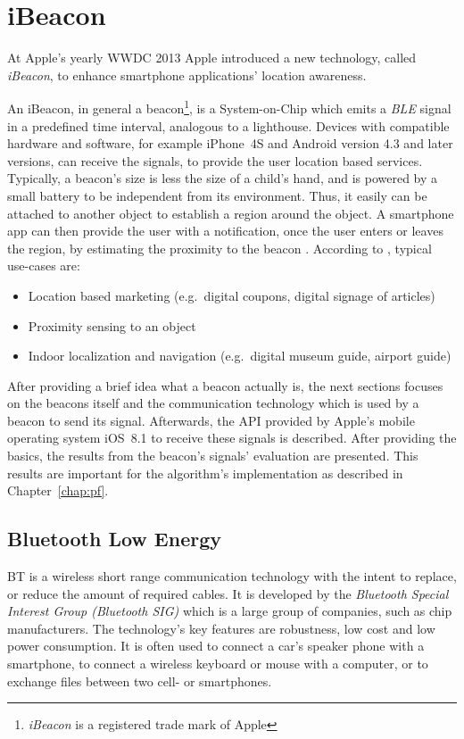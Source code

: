 \chapter{iBeacon} \label{chap:ibeacons}
At Apple's yearly \ac{WWDC} 2013 Apple introduced a new technology, called \emph{iBeacon}, to enhance smartphone applications' location awareness.

An iBeacon, in general a beacon\footnote{\emph{iBeacon} is a registered trade mark of Apple}, is a System-on-Chip which emits a \emph{\acl{BLE}} signal in a predefined time interval, analogous to a lighthouse. Devices with compatible hardware and software, for example iPhone~4S and Android version 4.3 and later versions, can receive the signals, to provide the user location based services. Typically, a beacon's size is less the size of a child's hand, and is powered by a small battery to be independent from its environment. Thus, it easily can be attached to another object to establish a region around the object. A smartphone app can then provide the user with a notification, once the user enters or leaves the region, by estimating the proximity to the beacon \citep{apple:getting_started,binside:ds}. According to \citet{binside:ds}, typical use-cases are:
\begin{itemize}
  \item Location based marketing (e.g.\ digital coupons, digital signage of articles)
  \item Proximity sensing to an object
  \item Indoor localization and navigation (e.g.\ digital museum guide, airport guide)
\end{itemize}

\noindent After providing a brief idea what a beacon actually is, the next sections focuses on the beacons itself and the communication technology which is used by a beacon to send its signal. Afterwards, the \acs{API} provided by Apple's mobile operating system iOS~8.1 to receive these signals is described. After providing the basics, the results from the beacon's signals' evaluation are presented. This results are important for the algorithm's implementation as described in Chapter~\ref{chap:pf}.


\section{Bluetooth Low Energy}\label{sec:ble}
\ac{BT} is a wireless short range communication technology with the intent to replace, or reduce the amount of required cables. It is developed by the \emph{Bluetooth Special Interest Group (Bluetooth SIG)} which is a large group of companies, such as chip manufacturers. The technology's key features are robustness, low cost and low power consumption. It is often used to connect a car's speaker phone with a smartphone, to connect a wireless keyboard or mouse with a computer, or to exchange files between two cell- or smartphones.

